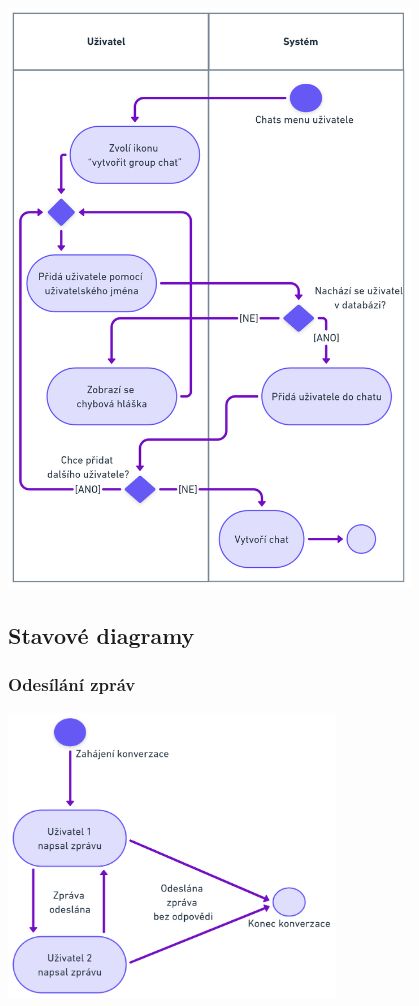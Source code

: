 \documentclass[czech,12pt,a4paper,titlepage]{article}
\begin{document}
\includegraphics[width=0.8\textwidth, center]{Activity_diagram_3.png}

\clearpage

\subsection{Stavové diagramy}
\subsubsection{Odesílání zpráv}

\bigskip
\bigskip
\bigskip
\bigskip
\bigskip
\bigskip


\includegraphics[width=0.65\textwidth, center]{State_diagram_1.png}
\end{document}
